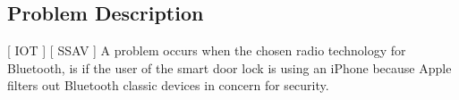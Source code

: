 \subsection{Problem Description}
[ IOT ] [ SSAV ] 
\newline
A problem occurs when the chosen radio technology for Bluetooth, is if the user of the smart door lock is using an iPhone because Apple filters out Bluetooth classic devices in concern for security. 